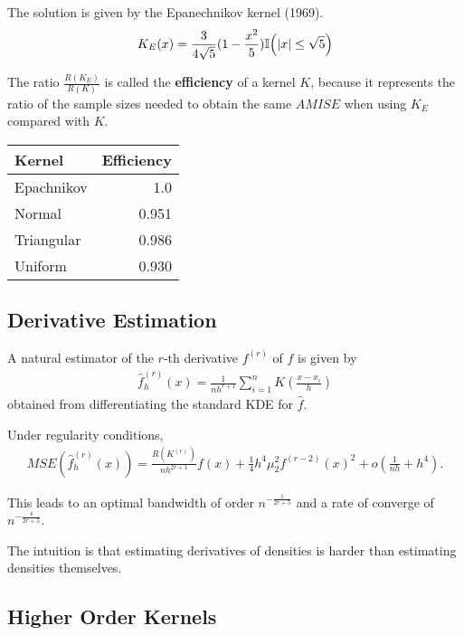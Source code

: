 The solution is given by the Epanechnikov kernel (1969).
\begin{align}
  \label{eq:41}
  K_{E}(x) = \frac{3}{4 \sqrt{5}}(1 - \frac{x^{2}}{5}) \I{|x| \leq \sqrt{5}}
\end{align}

The ratio $\frac{R(K_{E})}{R(K)}$ is called the \textbf{efficiency} of
a kernel $K$, because it represents the ratio of the sample sizes
needed to obtain the same $AMISE$ when using $K_{E}$ compared with $K$.


\begin{center}
\begin{tabular}{lr}
Kernel & Efficiency \\
\hline
Epachnikov & 1.0 \\
Normal & 0.951 \\
Triangular & 0.986 \\
Uniform & 0.930 \\
\end{tabular}
\end{center}

\subsection{Derivative Estimation}
\label{sec:deriv-estim-1}

A natural estimator of the $r$-th derivative $f^{(r)}$ of $f$ is given
by
\begin{align}
  \label{eq:33}
  \hat f^{(r)}_{h}(x) = \frac{1}{n h^{r+1}} \sum_{i=1}^{n} K(\frac{x -
  x_{i}}{h})
\end{align}
obtained from differentiating the standard KDE for $\hat f$.

Under regularity conditions,
\begin{align}
  \label{eq:39}
  MSE(\hat f^{(r)}_{h}(x)) = \frac{R(K^{(r)})}{nh^{2r+1}}f(x) +
  \frac{1}{4} h^{4} \mu_{2}^{2} f^{(r-2)}(x)^{2} + o(\frac{1}{nh} + h^{4}).
\end{align}

This leads to an optimal bandwidth of order $n^{-\frac{1}{2r + 5}}$
and a rate of converge of $n^{-\frac{4}{2r+5}}$.

The intuition is that estimating derivatives of densities is harder
than estimating densities themselves.

\subsection{Higher Order Kernels}
\label{sec:higher-order-kernels}

